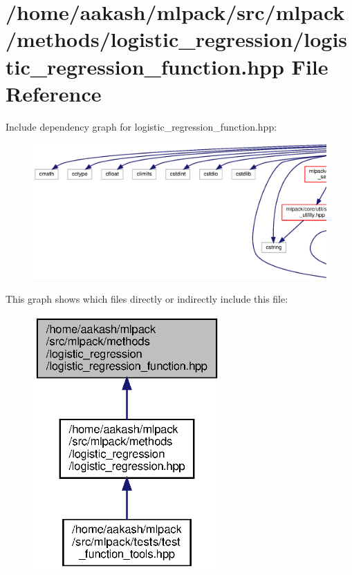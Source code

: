 \section{/home/aakash/mlpack/src/mlpack/methods/logistic\+\_\+regression/logistic\+\_\+regression\+\_\+function.hpp File Reference}
\label{logistic__regression__function_8hpp}
Include dependency graph for logistic\+\_\+regression\+\_\+function.\+hpp\+:
\nopagebreak
\begin{figure}[H]
\begin{center}
\leavevmode
\includegraphics[width=350pt]{logistic__regression__function_8hpp__incl}
\end{center}
\end{figure}
This graph shows which files directly or indirectly include this file\+:
\nopagebreak
\begin{figure}[H]
\begin{center}
\leavevmode
\includegraphics[width=203pt]{logistic__regression__function_8hpp__dep__incl}
\end{center}
\end{figure}
